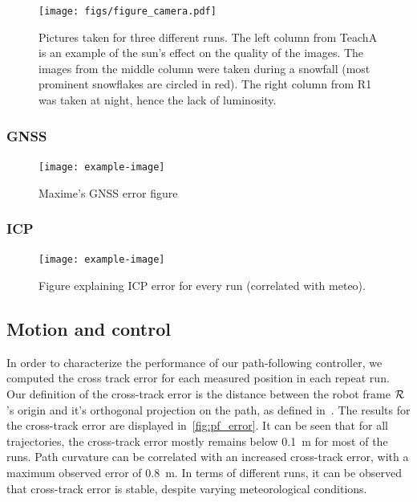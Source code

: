 \begin{figure} [htpb]
	\centering
	\texttt{[image: figs/figure\_camera.pdf]}
	\caption{Pictures taken for three different runs. The left column from TeachA is an example of the sun's effect on the quality of the images. The images from the middle column were taken during a snowfall (most prominent snowflakes are circled in red). The right column from R1 was taken at night, hence the lack of luminosity.}
	\label{fig:cameras_expo}
\end{figure}

\subsubsection{GNSS}
\label{sec:res_gnss}

\lightlipsum[1]

\begin{figure} [htpb]
	\centering
	\texttt{[image: example-image]}
	\caption{Maxime's GNSS error figure}
	\label{fig:gnss_error}
\end{figure}

\subsubsection{ICP}
\label{sec:ICP}

\lightlipsum[1]

\begin{figure} [htpb]
	\centering
	\texttt{[image: example-image]}
	\caption{Figure explaining ICP error for every run (correlated with meteo).}
	\label{fig:icp_error}
\end{figure}



\subsection{Motion and control}
\label{sec:res_motion}

In order to characterize the performance of our path-following controller, we computed the cross track error for each measured position in each repeat run.
Our definition of the cross-track error is the distance between the robot frame $\mathcal{R}$'s origin and it's orthogonal projection on the path, as defined in~\citep{Mondoloni2005}.
The results for the cross-track error are displayed in~\autoref{fig:pf_error}.
It can be seen that for all trajectories, the cross-track error mostly remains below \SI{0.1}{m} for most of the runs.
Path curvature can be correlated with an increased cross-track error, with a maximum observed error of \SI{0.8}{m}.
In terms of different runs, it can be observed that cross-track error is stable, despite varying meteorological conditions. 

